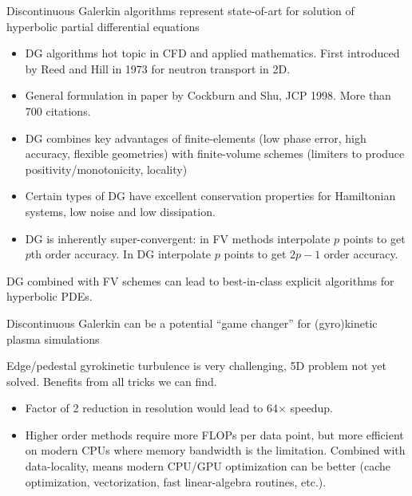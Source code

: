 \documentclass[pdf]{beamer}
\newcommand{\mypause}{}
\theoremstyle{definition}
\begin{document}
\begin{frame}{Discontinuous Galerkin algorithms represent state-of-art
    for solution of hyperbolic partial differential equations}
  \begin{itemize}
    \small
  \item DG algorithms hot topic in CFD and applied mathematics. First
    introduced by Reed and Hill in 1973 for neutron transport in 2D.
    \mypause
  \item General formulation in paper by Cockburn and Shu, JCP
    1998. More than 700 citations.  \mypause
  \item DG combines key advantages of finite-elements (low phase
    error, high accuracy, flexible geometries) with finite-volume
    schemes (limiters to produce positivity/monotonicity, locality)
    \mypause
  \item Certain types of DG have excellent conservation properties for
    Hamiltonian systems, low noise and low dissipation.
    \mypause
  \item DG is inherently super-convergent: in FV methods interpolate
    $p$ points to get $p$th order accuracy. In DG interpolate $p$
    points to get $2p-1$ order accuracy.
  \end{itemize}
  DG combined with FV schemes can lead to best-in-class explicit
  algorithms for hyperbolic PDEs.

\end{frame}

\begin{frame}{Discontinuous Galerkin can be a potential ``game
    changer'' for (gyro)kinetic plasma simulations}
  
  Edge/pedestal gyrokinetic turbulence is very challenging, 5D problem
  not yet solved. Benefits from all tricks we can find.
  \begin{itemize}
  \item Factor of 2 reduction in resolution would lead to 64$\times$
    speedup.
  \item Higher order methods require more FLOPs per data point, but
    more efficient on modern CPUs where memory bandwidth is the
    limitation.  Combined with data-locality, means modern CPU/GPU
    optimization can be better (cache optimization, vectorization,
    fast linear-algebra routines, etc.).
  \end{itemize}

\end{frame}
\end{document}
